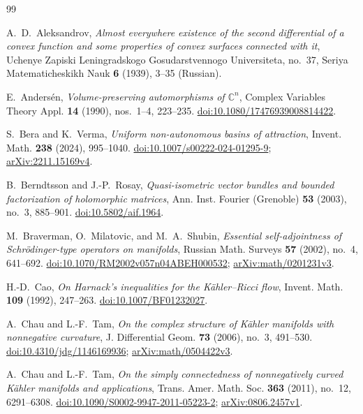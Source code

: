 \documentclass[11pt]{article}
\theoremstyle{definition}
\theoremstyle{remark}
\numberwithin{equation}{section}
\begin{document}
\begin{thebibliography}{99}

A.~D.~Aleksandrov,
\emph{Almost everywhere existence of the second differential of a convex
function and some properties of convex surfaces connected with it},
Uchenye Zapiski Leningradskogo Gosudarstvennogo Universiteta,
no.~37, Seriya Matematicheskikh Nauk \textbf{6} (1939), 3--35 (Russian).

E.~Anders\'en,
\emph{Volume-preserving automorphisms of $\mathbb C^n$},
Complex Variables Theory Appl. \textbf{14} (1990), nos.~1--4, 223--235.
\href{https://doi.org/10.1080/17476939008814422}
{doi:10.1080/17476939008814422}.

S.~Bera and K.~Verma,
\emph{Uniform non-autonomous basins of attraction},
Invent. Math. \textbf{238} (2024), 995--1040.
\href{https://doi.org/10.1007/s00222-024-01295-9}
{doi:10.1007/s00222-024-01295-9};
\href{https://arxiv.org/abs/2211.15169v4}{arXiv:2211.15169v4}.

B.~Berndtsson and J.-P.~Rosay,
\emph{Quasi-isometric vector bundles and bounded factorization of
holomorphic matrices},
Ann. Inst. Fourier (Grenoble) \textbf{53} (2003), no.~3, 885--901.
\href{https://doi.org/10.5802/aif.1964}{doi:10.5802/aif.1964}.

M.~Braverman, O.~Milatovic, and M.~A.~Shubin,
\emph{Essential self-adjointness of Schr\"odinger-type operators on manifolds},
Russian Math. Surveys \textbf{57} (2002), no.~4, 641--692.
\href{https://doi.org/10.1070/RM2002v057n04ABEH000532}
{doi:10.1070/RM2002v057n04ABEH000532};
\href{https://arxiv.org/abs/math/0201231v3}{arXiv:math/0201231v3}.

H.-D.~Cao,
\emph{On Harnack's inequalities for the K\"ahler--Ricci flow},
Invent. Math. \textbf{109} (1992), 247--263.
\href{https://doi.org/10.1007/BF01232027}{doi:10.1007/BF01232027}.

A.~Chau and L.-F.~Tam,
\emph{On the complex structure of K\"ahler manifolds with nonnegative curvature},
J. Differential Geom. \textbf{73} (2006), no.~3, 491--530.
\href{https://doi.org/10.4310/jdg/1146169936}{doi:10.4310/jdg/1146169936};
\href{https://arxiv.org/abs/math/0504422v3}{arXiv:math/0504422v3}.

A.~Chau and L.-F.~Tam,
\emph{On the simply connectedness of nonnegatively curved
K\"ahler manifolds and applications},
Trans. Amer. Math. Soc. \textbf{363} (2011), no.~12, 6291--6308.
\href{https://doi.org/10.1090/S0002-9947-2011-05223-2}
{doi:10.1090/S0002-9947-2011-05223-2};
\href{https://arxiv.org/abs/0806.2457v1}{arXiv:0806.2457v1}.


\end{thebibliography}
\end{document}
